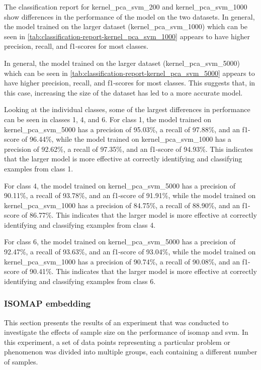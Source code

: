

The classification report for kernel\_pca\_svm\_200 and kernel\_pca\_svm\_1000 show differences in the performance of the model on the two datasets. In general, the model trained on the larger dataset (kernel\_pca\_svm\_1000) which can be seen in \autoref{tab:classification-report-kernel_pca_svm_1000} appears to have higher precision, recall, and f1-scores for most classes.



In general, the model trained on the larger dataset (kernel\_pca\_svm\_5000) which can be seen in \autoref{tab:classification-report-kernel_pca_svm_5000} appears to have higher precision, recall, and f1-scores for most classes. This suggests that, in this case, increasing the size of the dataset has led to a more accurate model.

Looking at the individual classes, some of the largest differences in performance can be seen in classes 1, 4, and 6. For class 1, the model trained on kernel\_pca\_svm\_5000 has a precision of 95.03\%, a recall of 97.88\%, and an f1-score of 96.44\%, while the model trained on kernel\_pca\_svm\_1000 has a precision of 92.62\%, a recall of 97.35\%, and an f1-score of 94.93\%. This indicates that the larger model is more effective at correctly identifying and classifying examples from class 1.

For class 4, the model trained on kernel\_pca\_svm\_5000 has a precision of 90.11\%, a recall of 93.78\%, and an f1-score of 91.91\%, while the model trained on kernel\_pca\_svm\_1000 has a precision of 84.75\%, a recall of 88.90\%, and an f1-score of 86.77\%. This indicates that the larger model is more effective at correctly identifying and classifying examples from class 4.

For class 6, the model trained on kernel\_pca\_svm\_5000 has a precision of 92.47\%, a recall of 93.63\%, and an f1-score of 93.04\%, while the model trained on kernel\_pca\_svm\_1000 has a precision of 90.74\%, a recall of 90.08\%, and an f1-score of 90.41\%. This indicates that the larger model is more effective at correctly identifying and classifying examples from class 6.

\subsubsection{ISOMAP embedding}\label{subsubsec:experiment_4_isomap}
This section presents the results of an experiment that was conducted to investigate the effects of sample size on the performance of \gls{isomap} and \gls{svm}. In this experiment, a set of data points representing a particular problem or phenomenon was divided into multiple groups, each containing a different number of samples.

